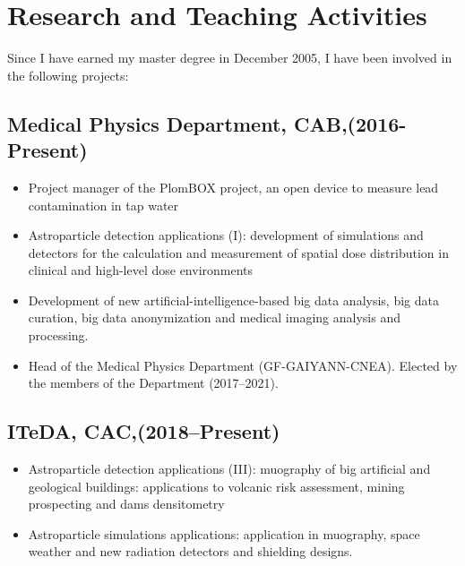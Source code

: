 \ifeng
\section*{Research and Teaching Activities}

Since I have earned my master degree in December 2005, I have been involved in the following projects:

\subsection*{Medical Physics Department, CAB,(2016-Present)}
\begin{itemize}
	\item Project manager of the PlomBOX project, an open device to measure lead contamination in tap water
	\item Astroparticle detection applications (I): development of
		simulations and detectors for the calculation and measurement
		of spatial dose distribution in clinical and high-level
		dose environments
 	\item Development of new artificial-intelligence-based big data analysis, big data curation, big data anonymization and medical imaging analysis and processing.
	\item Head of the Medical Physics Department (GF-GAIYANN-CNEA).
	Elected by the members of the Department (2017--2021).
\end{itemize}

\subsection*{ITeDA, CAC,(2018--Present)}
\begin{itemize}
	\item Astroparticle detection applications (III): muography of big artificial and geological buildings: applications
	to volcanic risk assessment, mining prospecting and dams densitometry
	\item Astroparticle simulations applications: application in muography, space weather and new radiation detectors
	and shielding designs.
\end{itemize}

